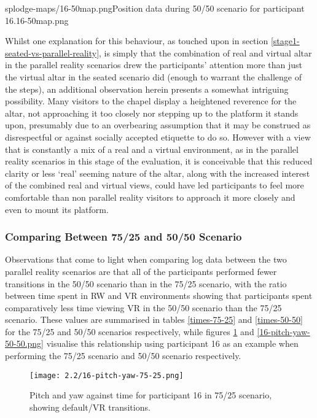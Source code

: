        {splodge-maps/16-50map.png}{Position data during 50/50 scenario for participant 16.}{16-50map.png}

Whilst one explanation for this behaviour, as touched upon in section \ref{stage1-seated-vs-parallel-reality}, is simply that the combination of real and virtual altar in the parallel reality scenarios drew the participants' attention more than just the virtual altar in the seated scenario did (enough to warrant the challenge of the steps), an additional observation herein presents a somewhat intriguing possibility. Many visitors to the chapel display a heightened reverence for the altar, not approaching it too closely nor stepping up to the platform it stands upon, presumably due to an overbearing assumption that it may be construed as disrespectful or against socially accepted etiquette to do so. However with a view that is constantly a mix of a real and a virtual environment, as in the parallel reality scenarios in this stage of the evaluation, it is conceivable that this reduced clarity or less `real' seeming nature of the altar, along with the increased interest of the combined real and virtual views, could have led participants to feel more comfortable than non parallel reality visitors to approach it more closely and even to mount its platform.


\subsubsection{Comparing Between 75/25 and 50/50 Scenario}

Observations that come to light when comparing log data between the two parallel reality scenarios are that all of the participants performed fewer transitions in the 50/50 scenario than in the 75/25 scenario, with the ratio between time spent in RW and VR environments showing that participants spent comparatively less time viewing VR in the 50/50 scenario than the 75/25 scenario. These values are summarised in tables \ref{times-75-25} and \ref{times-50-50} for the 75/25 and 50/50 scenarios respectively, while figures \ref{16-pitch-yaw-75-25.png} and \ref{16-pitch-yaw-50-50.png} visualise this relationship using participant 16 as an example when performing the 75/25 scenario and 50/50 scenario respectively.

\begin{figure}
	\begin{center}
	\texttt{[image: 2.2/16-pitch-yaw-75-25.png]}
	\caption{Pitch and yaw against time for participant 16 in 75/25 scenario, showing default/VR transitions.}
	\label{16-pitch-yaw-75-25.png}
	\end{center}
\end{figure}

